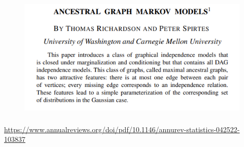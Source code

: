 \documentclass{beamer}
\begin{document}
\begin{frame}
	\frametitle{}
	\begin{figure}
		\includegraphics[scale=0.5]{imgs/mag.png}
	\end{figure}
\end{frame}

\begin{frame}
	\frametitle{}
\end{frame}

\begin{frame}
	\frametitle{}
	\url{https://www.annualreviews.org/doi/pdf/10.1146/annurev-statistics-042522-103837}
\end{frame}
\end{document}

